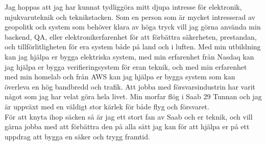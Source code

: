 \documentclass[../../main.tex]{subfiles}
\begin{document}
Jag hoppas att jag har kunnat tydliggöra mitt djupa intresse för elektronik, mjukvaruteknik och teknikstacken. Som en person som är mycket intresserad av geopolitk och system som behöver klara av höga tryck vill jag görna använda min backend, QA, eller elektronikerfarenhet för att förbättra säkerheten, prestandan, och tillförlitligheten för era system både på land och i luften. Med min utbildning kan jag hjälpa er bygga elektriska system, med min erfarenhet från Nasdaq kan jag hjälpa er bygga verifieringsystem för eran teknik, och med min erfarenhet med min homelab och från AWS kan jag hjälpa er bygga system som kan överleva en hög bandbredd och trafik. Att jobba med försvarsindustrin har varit något som jag har velat göra hela livet. Min morfar flög i Saab 29 Tunnan och jag är uppväxt med en väldigt stor kärlek för både flyg och försvaret.
\\
För att knyta ihop säcken så är jag ett stort fan av Saab och er teknik, och vill gärna jobba med att förbättra den på alla sätt jag kan för att hjälpa er på ett uppdrag att bygga en säker och trygg framtid.

\\
\end{document}
